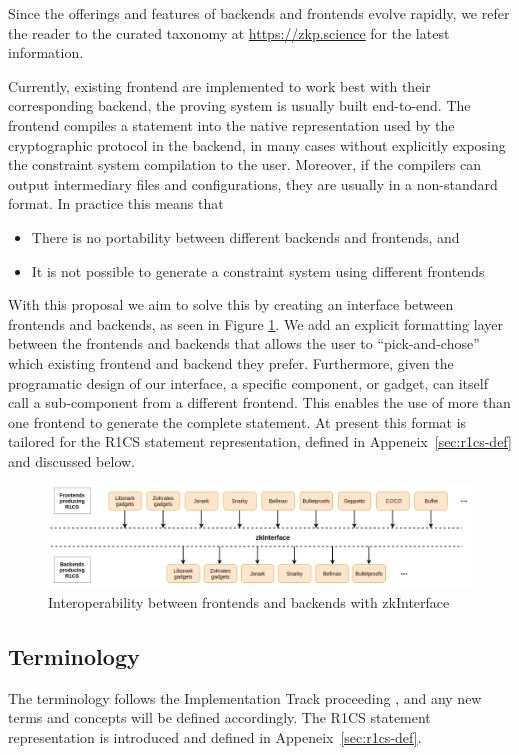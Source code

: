 \documentclass[a4paper,12pt]{article}
\begin{document}
Since the offerings and features of backends and frontends evolve rapidly, we refer the reader to the curated taxonomy at \url{https://zkp.science} for the latest information.  

Currently, existing frontend are implemented to work best with their corresponding backend, the proving system is usually built end-to-end. The frontend compiles a statement into the native representation used by the cryptographic protocol in the backend, in many cases without explicitly exposing the constraint system compilation to the user. Moreover, if the compilers can output intermediary files and configurations, they are usually in a non-standard format. In practice this means that
\begin{itemize}
	\item There is no portability between different backends and frontends, and
	\item It is not possible to generate a constraint system using different frontends
\end{itemize}   

With this proposal we aim to solve this by creating an interface between frontends and backends, as seen in Figure \ref{interface}. We add an explicit formatting layer between the frontends and backends that allows the user to ``pick-and-chose'' which existing frontend and backend they prefer. Furthermore, given the programatic design of our interface, a specific component, or gadget, can itself call a sub-component from a different frontend. This enables the use of more than one frontend to generate the complete statement. At present this format is tailored for the R1CS statement representation, defined in Appeneix~\ref{sec:r1cs-def} and discussed below.

\begin{figure}[h!]
	\includegraphics[width=\linewidth]{graphics/interop.png}
	\caption{Interoperability between frontends and backends with zkInterface}
	\label{interface}
\end{figure}

\subsection{Terminology}
The terminology follows the Implementation Track proceeding \cite{ZKProofImplementation}, and any new terms and concepts will be defined accordingly. The R1CS statement representation is introduced and defined in Appeneix~\ref{sec:r1cs-def}.
\end{document}
